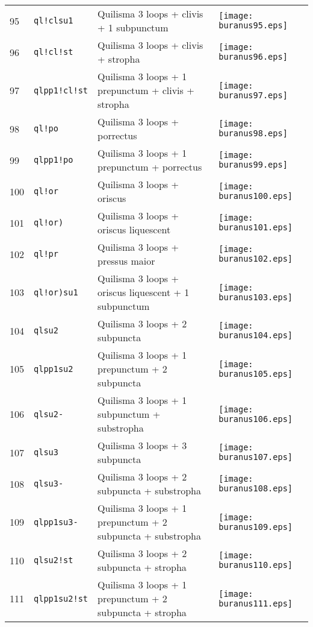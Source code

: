\documentclass{scrarticle}
\begin{document}
\begin{longtable}{l|l|l|l}
95 & \texttt{ql!clsu1} & Quilisma 3 loops + clivis + 1 subpunctum & \texttt{[image: buranus95.eps]} \\
96 & \texttt{ql!cl!st} & Quilisma 3 loops + clivis + stropha & \texttt{[image: buranus96.eps]} \\
97 & \texttt{qlpp1!cl!st} & Quilisma 3 loops + 1 prepunctum + clivis + stropha & \texttt{[image: buranus97.eps]} \\
98 & \texttt{ql!po} & Quilisma 3 loops + porrectus & \texttt{[image: buranus98.eps]} \\
99 & \texttt{qlpp1!po} & Quilisma 3 loops + 1 prepunctum + porrectus & \texttt{[image: buranus99.eps]} \\
100 & \texttt{ql!or} & Quilisma 3 loops + oriscus & \texttt{[image: buranus100.eps]} \\
101 & \texttt{ql!or)} & Quilisma 3 loops + oriscus liquescent & \texttt{[image: buranus101.eps]} \\
102 & \texttt{ql!pr} & Quilisma 3 loops + pressus maior & \texttt{[image: buranus102.eps]} \\
103 & \texttt{ql!or)su1} & Quilisma 3 loops + oriscus liquescent + 1 subpunctum & \texttt{[image: buranus103.eps]} \\
104 & \texttt{qlsu2} & Quilisma 3 loops + 2 subpuncta & \texttt{[image: buranus104.eps]} \\
105 & \texttt{qlpp1su2} & Quilisma 3 loops + 1 prepunctum + 2 subpuncta & \texttt{[image: buranus105.eps]} \\
106 & \texttt{qlsu2-} & Quilisma 3 loops + 1 subpunctum + substropha & \texttt{[image: buranus106.eps]} \\
107 & \texttt{qlsu3} & Quilisma 3 loops + 3 subpuncta & \texttt{[image: buranus107.eps]} \\
108 & \texttt{qlsu3-} & Quilisma 3 loops + 2 subpuncta + substropha & \texttt{[image: buranus108.eps]} \\
109 & \texttt{qlpp1su3-} & Quilisma 3 loops + 1 prepunctum + 2 subpuncta + substropha & \texttt{[image: buranus109.eps]} \\
110 & \texttt{qlsu2!st} & Quilisma 3 loops + 2 subpuncta + stropha & \texttt{[image: buranus110.eps]} \\
111 & \texttt{qlpp1su2!st} & Quilisma 3 loops + 1 prepunctum + 2 subpuncta + stropha & \texttt{[image: buranus111.eps]} \\

\end{longtable}
\end{document}
